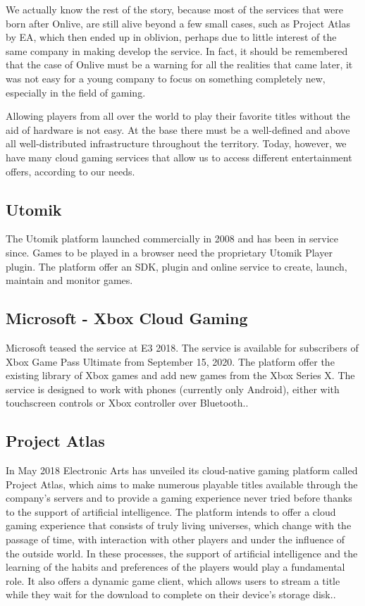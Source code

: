 We actually know the rest of the story, because most of the services that were born after Onlive, are still alive beyond a few small cases, such as Project Atlas by EA, which then ended up in oblivion, perhaps due to little interest of the same company in making develop the service. In fact, it should be remembered that the case of Onlive must be a warning for all the realities that came later, it was not easy for a young company to focus on something completely new, especially in the field of gaming.

Allowing players from all over the world to play their favorite titles without the aid of hardware is not easy. At the base there must be a well-defined and above all well-distributed infrastructure throughout the territory. Today, however, we have many cloud gaming services that allow us to access different entertainment offers, according to our needs.
\subsection{Utomik}
The Utomik platform launched commercially in 2008 and has been in service since. Games to be played in a browser need the proprietary Utomik Player plugin. The platform offer an SDK, plugin and online service to create, launch, maintain and monitor games\cite{Utomik}.
\subsection{Microsoft - Xbox Cloud Gaming}
Microsoft teased the service at E3 2018. The service is available for subscribers of Xbox Game Pass Ultimate from September 15, 2020. The platform offer the existing library of Xbox games and add new games from the Xbox Series X. The service is designed to work with phones (currently only Android), either with touchscreen controls or Xbox controller over Bluetooth.\cite{Xbox_Game_Pass_cloud_gaming}.
\subsection{Project Atlas}
In May 2018 Electronic Arts has unveiled its cloud-native gaming platform called Project Atlas, which aims to make numerous playable titles available through the company's servers and to provide a gaming experience never tried before thanks to the support of artificial intelligence. The platform intends to offer a cloud gaming experience that consists of truly living universes, which change with the passage of time, with interaction with other players and under the influence of the outside world. In these processes, the support of artificial intelligence and the learning of the habits and preferences of the players would play a fundamental role. It also offers a dynamic game client, which allows users to stream a title while they wait for the download to complete on their device's storage disk.\cite{Project_Atlas}.
